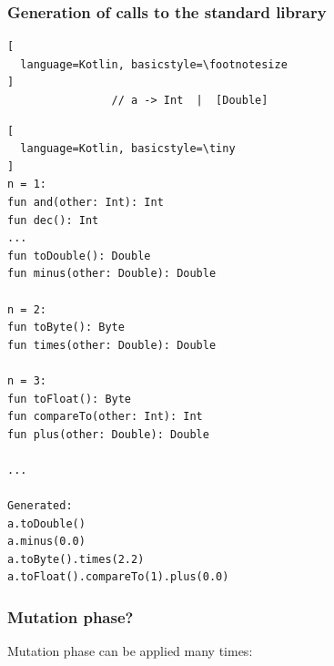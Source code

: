 
\begin{frame}[fragile]
	\frametitle{Generation of calls to the standard library}

\begin{lstlisting}[
  language=Kotlin, basicstyle=\footnotesize
]
                // a -> Int  |  [Double] 
\end{lstlisting}
\begin{lstlisting}[
  language=Kotlin, basicstyle=\tiny
]
n = 1:
fun and(other: Int): Int
fun dec(): Int
...
fun toDouble(): Double 
fun minus(other: Double): Double

n = 2:
fun toByte(): Byte
fun times(other: Double): Double

n = 3:
fun toFloat(): Byte
fun compareTo(other: Int): Int
fun plus(other: Double): Double

...

Generated:
a.toDouble()
a.minus(0.0)
a.toByte().times(2.2)
a.toFloat().compareTo(1).plus(0.0)
\end{lstlisting}

\end{frame}





\begin{frame}[fragile]
	\frametitle{Mutation phase?}
	Mutation phase can be applied many times:
\end{frame}


